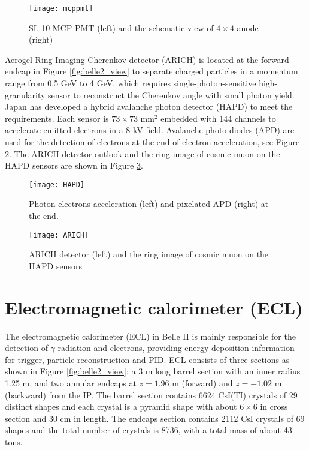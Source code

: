 \begin{figure}[htpb]
	\centering
	\texttt{[image: mcppmt]}
	\caption{SL-10 MCP PMT (left) and the schematic view of $4\times 4$ anode (right)\cite{Abe:2010gxa}}
	\label{fig:mcppmt}
\end{figure}

Aerogel Ring-Imaging Cherenkov
detector (ARICH) is located at the forward endcap in Figure \ref{fig:belle2_view} to separate charged particles in a momentum range from 0.5 GeV to 4 GeV, which requires single-photon-sensitive high-granularity sensor to reconstruct the Cherenkov angle with small photon yield.  
Japan has developed a hybrid avalanche photon detector (HAPD) to meet the requirements. Each sensor is $73 \times 73$ mm$^2$ embedded with 144 channels to accelerate emitted electrons in a 8 kV field. Avalanche photo-diodes (APD) are used for the detection of electrons at the end of electron acceleration, see Figure \ref{fig:arich_img}. The ARICH detector outlook and the ring image of cosmic muon on the HAPD sensors are shown in Figure \ref{fig:HAPD}.

\begin{figure}[htpb]
	\centering
	\texttt{[image: HAPD]}
	\caption{Photon-electrons acceleration (left) and pixelated APD (right) at the end\cite{Abe:2010gxa}.}
	\label{fig:arich_img}
\end{figure}



\begin{figure}[htpb]
	\centering
	\texttt{[image: ARICH]}
	\caption{ARICH detector (left) and the ring image of cosmic muon on the HAPD sensors\cite{b2book}}
	\label{fig:HAPD}
\end{figure}

\section{Electromagnetic calorimeter (ECL)}
The electromagnetic calorimeter (ECL) in Belle II is mainly responsible for the detection of $\gamma$ radiation and electrons, providing energy deposition information for trigger, particle reconstruction and PID. ECL consists of three sections as shown in Figure \ref{fig:belle2_view}: a 3 m long barrel section with an inner radius 1.25 m, and two annular endcaps at $z = 1.96$ m (forward) and $z = -1.02$ m (backward) from the IP. The barrel section contains 6624 CsI(TI) crystals of 29 distinct shapes and each crystal is a pyramid shape with about $6\times 6$ in cross section and 30 cm in length. The endcaps section contains 2112 CsI crystals of 69 shapes and the total number of crystals is 8736, with a total
mass of about 43 tons\cite{Abe:2010gxa}.

